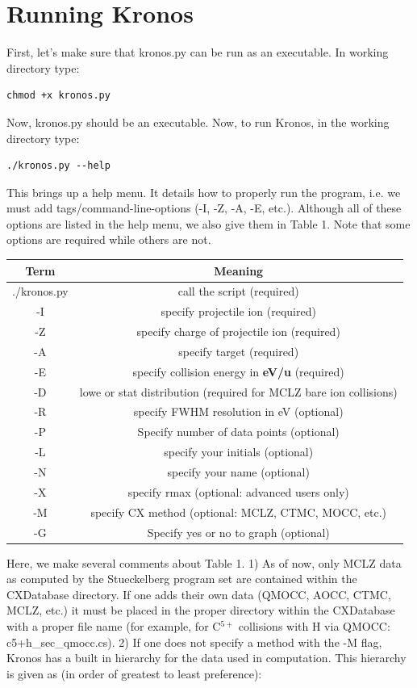 \documentclass[twocolumn, prb, amsmath,amssymb,amsfonts]{revtex4}
\begin{document}
\section{Running Kronos}
First, let's make sure that kronos.py can be run as an executable.  In working directory type:
\begin{verbatim}
chmod +x kronos.py
\end{verbatim}
Now, kronos.py should be an executable.  Now, to run Kronos, in the working directory type:
\begin{verbatim}
./kronos.py --help
\end{verbatim}
This brings up a help menu.  It details how to properly run the program, i.e. we must add tags/command-line-options (-I, -Z, -A, -E, etc.).  Although all of these options are listed in the help menu, we also give them in Table 1.  Note that some options are required while others are not.
\begin{table}[H]
\centering
\footnotesize
\begin{tabular}{|c|c|}
\hline 
Term & Meaning \\ 
\hline 
./kronos.py & call the script (required) \\ 
\hline
-I & specify projectile ion (required) \\ 
\hline 
-Z & specify charge of projectile ion (required) \\ 
\hline 
-A & specify target (required) \\ 
\hline
-E & specify collision energy in \textbf{eV/u} (required) \\ 
\hline
-D &  lowe or stat distribution (required for MCLZ bare ion collisions) \\
\hline 
-R & specify FWHM resolution in eV (optional) \\
\hline
-P & Specify number of data points (optional) \\ 
\hline 
-L & specify your initials (optional) \\ 
\hline
-N & specify your name (optional) \\ 
\hline 
-X & specify rmax (optional: advanced users only) \\
\hline
-M & specify CX method (optional: MCLZ, CTMC, MOCC, etc.) \\
\hline
-G & Specify yes or no to graph (optional) \\
\hline
\end{tabular} 
\end{table}
Here, we make several comments about Table 1.  1) As of now, only MCLZ data as computed by the Stueckelberg program set are contained within the CXDatabase directory.  If one adds their own data (QMOCC, AOCC, CTMC, MCLZ, etc.) it must be placed in the proper directory within the CXDatabase with a proper file name (for example, for C$^{5+}$ collisions with H via QMOCC: c5+h\_sec\_qmocc.cs).  2) If one does not specify a method with the -M flag, Kronos has a built in hierarchy for the data used in computation.  This hierarchy is given as (in order of greatest to  least preference):
\end{document}
